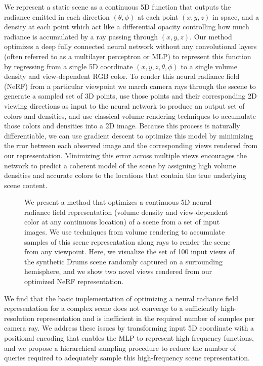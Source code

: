 \documentclass[12pt]{article}
\begin{document}
We represent a static scene as a continuous 5D function that outputs the radiance emitted in each direction $(\theta,\phi)$ at each point $(x,y,z)$ in space, 
and a density at each point which act like a differential opacity controlling how much radiance is accumulated by a ray passing through $(x,y,z)$. Our method optimizes a deep 
fully connected neural network without any convolutional layers (often referred to as a multilayer perceptron or MLP) to represent this function by regressing from a single 5D coordinate
$(x,y,z,\theta,\phi)$ to a single volume density and view-dependent RGB color. To render this neural radiance field (NeRF) from a particular viewpoint we march camera rays through the sscene to generate a sampled set of 3D points,
use those points and their corresponding 2D viewing directions as input to the neural network to produce an output set of colors and densities, and use classical volume rendering techniques to 
accumulate those colors and densities into a 2D image. Because this process is naturally differentiable, we can use gradient descent to optimize this model by minimizing the rror between
each observed image and the corresponding views rendered from our representation. Minimizing this error across multiple views encourages the network to predict a coherent model of the scene by assigning 
high volume densities and accurate colors to the locations that contain the true underlying scene content. 

\begin{figure}
\caption{We present a method that optimizes a continuous 5D neural radiance field representation (volume density and view-dependent color at any continuous location) 
of a scene from a set of input images. We use techniques from volume rendering to accumulate samples of this scene representation along rays to render the scene from any viewpoint. 
Here, we visualize the set of 100 input views of the synthetic Drums scene randomly captured on a surrounding hemisphere, and we show two novel views rendered from our optimized NeRF representation.}
\end{figure}

We find that the basic implementation of optimizing a neural radiance field representation for a complex scene
does not converge to a sufficiently high-resolution representation and is inefficient in the required number of samples 
per camera ray. We address these issues by transforming input 5D coordinate with a positional encoding that enables the MLP to represent
high frequency functions, and we propose a hierarchical sampling procedure to reduce the number of queries required to adequately sample this high-frequency scene representation.
\end{document}
